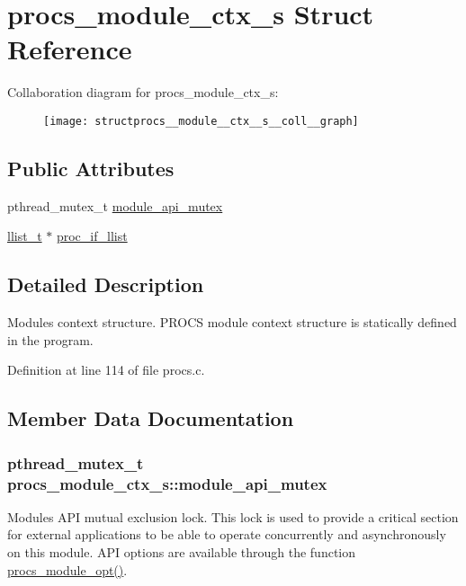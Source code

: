 \hypertarget{structprocs__module__ctx__s}{}\section{procs\+\_\+module\+\_\+ctx\+\_\+s Struct Reference}
\label{structprocs__module__ctx__s}


Collaboration diagram for procs\+\_\+module\+\_\+ctx\+\_\+s\+:\nopagebreak
\begin{figure}[H]
\begin{center}
\leavevmode
\texttt{[image: structprocs\_\_module\_\_ctx\_\_s\_\_coll\_\_graph]}
\end{center}
\end{figure}
\subsection*{Public Attributes}
\begin{DoxyCompactItemize}
\item 
pthread\+\_\+mutex\+\_\+t \hyperlink{structprocs__module__ctx__s_a10c3a0b462ead663af1b117abdfdadaa}{module\+\_\+api\+\_\+mutex}
\item 
\hyperlink{llist_8h_a90862badf6f9cc4e3d6348b7d60ce4f0}{llist\+\_\+t} $\ast$ \hyperlink{structprocs__module__ctx__s_a8a7a2cc3f2ee076ae11b7fdc63645f41}{proc\+\_\+if\+\_\+llist}
\end{DoxyCompactItemize}


\subsection{Detailed Description}
Module\textquotesingle{}s context structure. P\+R\+O\+CS module context structure is statically defined in the program. 

Definition at line 114 of file procs.\+c.



\subsection{Member Data Documentation}
\subsubsection[{\texorpdfstring{module\+\_\+api\+\_\+mutex}{module_api_mutex}}]{\setlength{\rightskip}{0pt plus 5cm}pthread\+\_\+mutex\+\_\+t procs\+\_\+module\+\_\+ctx\+\_\+s\+::module\+\_\+api\+\_\+mutex}\hypertarget{structprocs__module__ctx__s_a10c3a0b462ead663af1b117abdfdadaa}{}\label{structprocs__module__ctx__s_a10c3a0b462ead663af1b117abdfdadaa}
Module\textquotesingle{}s A\+PI mutual exclusion lock. This lock is used to provide a critical section for external applications to be able to operate concurrently and asynchronously on this module. A\+PI options are available through the function \hyperlink{procs_8c_a226ac6dfd7598a59b9ceab3a92239a80}{procs\+\_\+module\+\_\+opt()}. 

